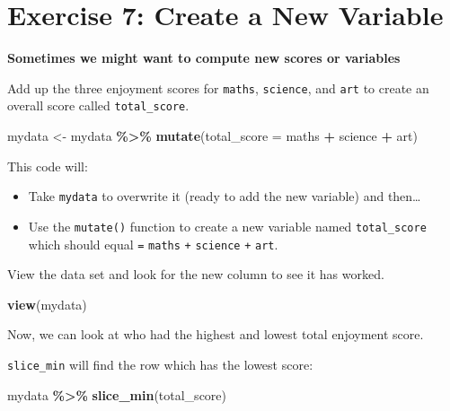 \documentclass[
]{book}
\newenvironment{Shaded}{\begin{snugshade}}{\end{snugshade}}
\newcommand{\AttributeTok}[1]{\textcolor[rgb]{0.13,0.29,0.53}{#1}}
\newcommand{\FunctionTok}[1]{\textcolor[rgb]{0.13,0.29,0.53}{\textbf{#1}}}
\newcommand{\NormalTok}[1]{#1}
\newcommand{\OtherTok}[1]{\textcolor[rgb]{0.56,0.35,0.01}{#1}}
\newcommand{\SpecialCharTok}[1]{\textcolor[rgb]{0.81,0.36,0.00}{\textbf{#1}}}
\let\oldsection\section
\renewcommand{\section}{\needspace{5\baselineskip}\oldsection}
\begin{document}
\section{Exercise 7: Create a New Variable}\label{exercise-7-create-a-new-variable}

\textbf{Sometimes we might want to compute new scores or variables}

Add up the three enjoyment scores for \texttt{maths}, \texttt{science}, and \texttt{art} to create an overall score called \texttt{total\_score}.

\begin{Shaded}
\begin{Highlighting}[]
\NormalTok{mydata }\OtherTok{\textless{}{-}}\NormalTok{ mydata }\SpecialCharTok{\%\textgreater{}\%}
  \FunctionTok{mutate}\NormalTok{(}\AttributeTok{total\_score =}\NormalTok{ maths }\SpecialCharTok{+}\NormalTok{ science }\SpecialCharTok{+}\NormalTok{ art)}
\end{Highlighting}
\end{Shaded}

This code will:

\begin{itemize}
\item
  Take \texttt{mydata} to overwrite it (ready to add the new variable) and then\ldots{}
\item
  Use the \texttt{mutate()} function to create a new variable named \texttt{total\_score} which should equal \texttt{=} \texttt{maths} \texttt{+} \texttt{science} \texttt{+} \texttt{art}.
\end{itemize}

View the data set and look for the new column to see it has worked.

\begin{Shaded}
\begin{Highlighting}[]
\FunctionTok{view}\NormalTok{(mydata)}
\end{Highlighting}
\end{Shaded}

Now, we can look at who had the highest and lowest total enjoyment score.

\texttt{slice\_min} will find the row which has the lowest score:

\begin{Shaded}
\begin{Highlighting}[]
\NormalTok{mydata }\SpecialCharTok{\%\textgreater{}\%}
  \FunctionTok{slice\_min}\NormalTok{(total\_score)}
\end{Highlighting}
\end{Shaded}
\end{document}
